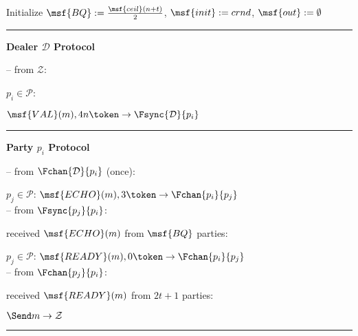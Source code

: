 \begin{bbox}[title={$\Pi_{\msf{Bracha}} (\mathcal{D}, \mathcal{P} = p_1,...,p_n)$ in $\F_{\msf{sync-chan}}$-hybrid}]

Initialize $\msf{BQ} := \frac{\msf{ceil}(n+t)}{2}$, $\msf{init} := crnd$, $\msf{out} := \emptyset$

\vspace{2mm} \hrule \vspace{2mm}

{\bf Dealer $\mathcal{D}$ Protocol}

-- \OnInput {} from $\mathcal{Z}$:

	\qquad \For $p_i \in \mathcal{P}$:

		\qquad \quad \Send $\msf{VAL}(m),4n \token \rightarrow \Fsync{\mathcal{D}}{p_i}$

\vspace{2mm} \hrule \vspace{2mm}

{\bf Party $p_i$ Protocol}

-- \OnInput {} from $\Fchan{\mathcal{D}}{p_i}$ (once):

	\qquad \For $p_j \in \mathcal{P}$: \Send $\msf{ECHO}(m), 3 \token \rightarrow \Fchan{p_i}{p_j}$\\

-- \OnInput {} from $\Fsync{p_j}{p_i}$:

	\qquad \If received $\msf{ECHO}(m)$ from $\msf{BQ}$ parties:

		\qquad \quad \For $p_j \in \mathcal{P}$: \Send $\msf{READY}(m), 0 \token \rightarrow \Fchan{p_i}{p_j}$ \\

-- \OnInput {} from $\Fchan{p_j}{p_i}$:

	\qquad \If received $\msf{READY}(m)$ from $2t+1$ parties:

		\qqquad $\Send m \rightarrow \mathcal{Z}$

\vspace{2mm} \hrule \vspace{2mm}

\end{bbox}

